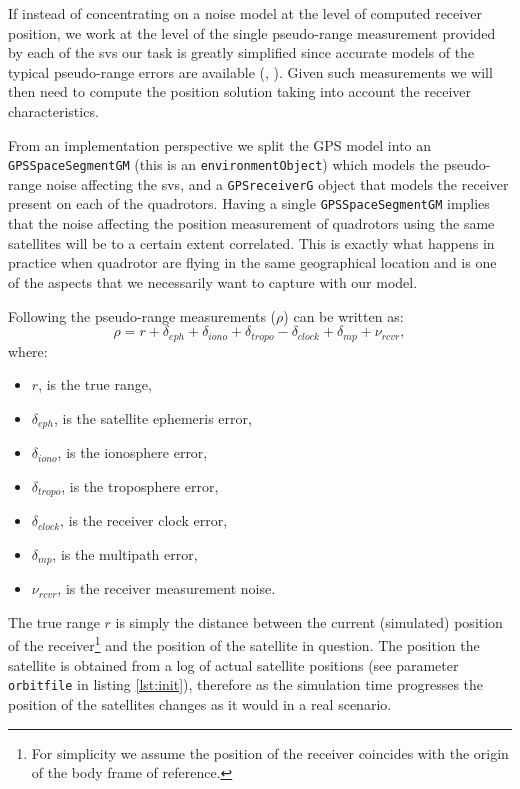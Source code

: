 \documentclass[a4paper,11pt]{report}
\begin{document}
If instead of concentrating on a noise model at the level of computed receiver position, we work at the level of the single pseudo-range measurement provided by each of the svs our task is greatly simplified since accurate models of the typical pseudo-range errors are available (\cite{rankin1994anerror}, \cite{carlson2010mapping}). Given such measurements we will then need to compute the position solution taking into account the receiver characteristics.

From an implementation perspective we split the GPS model into an \texttt{GPSSpaceSegmentGM} (this is an \texttt{environmentObject}) which models the pseudo-range noise affecting the svs, and a \texttt{GPSreceiverG} object that models the receiver present on each of the quadrotors. Having a single \texttt{GPSSpaceSegmentGM}
implies that the noise affecting the position measurement of quadrotors using the same satellites will be to a certain extent correlated. This is exactly what happens in practice when quadrotor are flying in the same geographical location and is one of the aspects that we necessarily want to capture with our model.
  
Following \cite{rankin1994anerror} the pseudo-range measurements ($\rho$) can be written as:  
\begin{equation}
\rho=r+\delta_{eph}+\delta_{iono}+\delta_{tropo}-\delta_{clock}+\delta_{mp}+\nu_{rcvr},
\end{equation}
where:
\begin{itemize}
\item $r$, is the true range,
\item $\delta_{eph}$, is the satellite ephemeris error,
\item $\delta_{iono}$, is the ionosphere error,
\item $\delta_{tropo}$, is the troposphere error,
\item $\delta_{clock}$, is the receiver clock error,
\item $\delta_{mp}$, is the multipath error,
\item $\nu_{rcvr}$, is the receiver measurement noise.
\end{itemize}
The true range $r$ is simply the distance between the current (simulated) position of the receiver\footnote{For simplicity we assume the position of the receiver coincides with the origin of the body frame of reference.} and the position of the satellite in question. The position the satellite is obtained from a log of actual satellite positions (see parameter \texttt{orbitfile} in listing \ref{lst:init}), therefore as the simulation time progresses the position of the satellites changes as it would in a real scenario.
\end{document}

